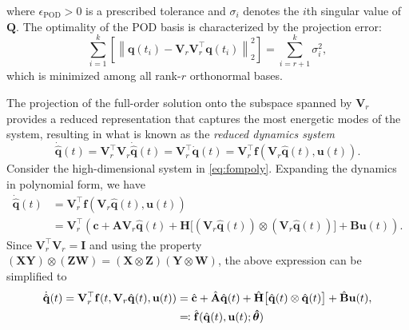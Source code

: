 where $\epsilon_{\text{POD}} > 0$ is a prescribed tolerance and $\sigma_i$ denotes the $i$th singular value of $\mathbf{Q}$. The optimality of the POD basis is characterized by the projection error:\\
\begin{equation}
    \sum_{i=1}^k\left[\left\|\mathbf{q}(t_i) - \mathbf{V}_r^{}\mathbf{V}_r^\top\mathbf{q}(t_i)\right\|_2^2\right] = \sum_{i=r+1}^k \sigma_i^2,
    \label{eq:pod_error}
\end{equation}
which is minimized among all rank-$r$ orthonormal bases.

The projection of the full-order solution onto the subspace spanned by $\mathbf{V}_r$ provides a reduced representation that captures the most energetic modes of the system, resulting in what is known as the \textit{reduced dynamics system}\\
\begin{equation}
    \dot{\hat{\mathbf{q}}}(t) = \mathbf{V}_r^{\top}\mathbf{V}_r^{}\dot{\hat{\mathbf{q}}}(t) = \mathbf{V}_r^{\top}\dot{\mathbf{q}}(t)  = \mathbf{V}_r^{\top}\mathbf{f}( \mathbf{V}_r\hat{\mathbf{q}}(t), \mathbf{u}(t)).
    \label{eq:reduced_system}
\end{equation}
Consider the high-dimensional system in \eqref{eq:fompoly}. Expanding the dynamics in polynomial form, we have\\
\begin{align*}
    \dot{\hat{\mathbf{q}}}(t) &= \mathbf{V}_r^{\top}\mathbf{f}(\mathbf{V}_r\hat{\mathbf{q}}(t), \mathbf{u}(t))\\
    &= \mathbf{V}_r^{\top}\left( \mathbf{c} + \mathbf{A}\mathbf{V}_r\hat{\mathbf{q}}(t) + \mathbf{H}\bigl[(\mathbf{V}_r\hat{\mathbf{q}}(t)) \otimes (\mathbf{V}_r\hat{\mathbf{q}}(t))\bigr] + \mathbf{B}\mathbf{u}(t) \right).
\end{align*}
Since $\mathbf{V}_r^{\top}\mathbf{V}_r^{} = \mathbf{I}$ and using the property $(\mathbf{XY})\otimes(\mathbf{ZW})=(\mathbf{X}\otimes\mathbf{Z})(\mathbf{Y}\otimes\mathbf{W})$, the above expression can be simplified to\\
\begin{align}
    \dot{\hat{\mathbf{q}}}(t) = \mathbf{V}_r^{\top}\mathbf{f}(t, \mathbf{V}_r\hat{\mathbf{q}}(t), \mathbf{u}(t)) &= \hat{\mathbf{c}} + \hat{\mathbf{A}}\hat{\mathbf{q}}(t) + \hat{\mathbf{H}}\bigl[ \hat{\mathbf{q}}(t)\otimes\hat{\mathbf{q}}(t)\bigr] + \hat{\mathbf{B}}\mathbf{u}(t),\notag \\
    &\eqqcolon \hat{\mathbf{f}}(\hat{\mathbf{q}}(t),\mathbf{u}(t);\bm{\hat{\theta}})
    \label{eq:redopinf}
\end{align}
